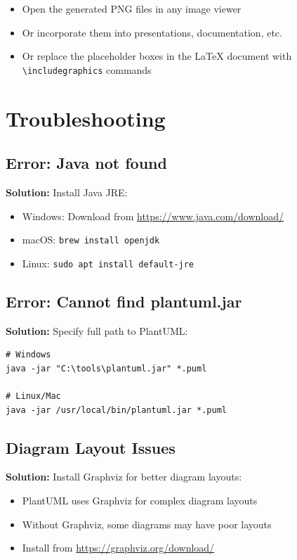 \documentclass[12pt,a4paper]{report}
\begin{document}
\begin{itemize}
    \item Open the generated PNG files in any image viewer
    \item Or incorporate them into presentations, documentation, etc.
    \item Or replace the placeholder boxes in the LaTeX document with \texttt{\textbackslash includegraphics} commands
\end{itemize}

\section{Troubleshooting}

\subsection{Error: Java not found}

\textbf{Solution:} Install Java JRE:

\begin{itemize}
    \item Windows: Download from \url{https://www.java.com/download/}
    \item macOS: \texttt{brew install openjdk}
    \item Linux: \texttt{sudo apt install default-jre}
\end{itemize}

\subsection{Error: Cannot find plantuml.jar}

\textbf{Solution:} Specify full path to PlantUML:

\begin{lstlisting}[style=bashStyle]
# Windows
java -jar "C:\tools\plantuml.jar" *.puml

# Linux/Mac
java -jar /usr/local/bin/plantuml.jar *.puml
\end{lstlisting}

\subsection{Diagram Layout Issues}

\textbf{Solution:} Install Graphviz for better diagram layouts:

\begin{itemize}
    \item PlantUML uses Graphviz for complex diagram layouts
    \item Without Graphviz, some diagrams may have poor layouts
    \item Install from \url{https://graphviz.org/download/}
\end{itemize}
\end{document}
